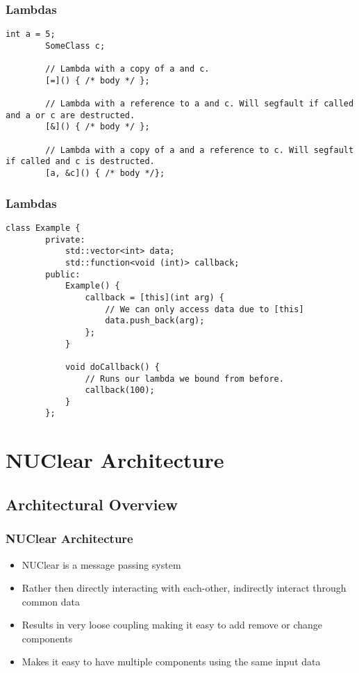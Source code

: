 \documentclass{beamer}
\begin{document}
\begin{frame}[fragile]
	\frametitle{Lambdas}
	\begin{lstlisting}[language=nuclear]
		int a = 5;
		SomeClass c;

		// Lambda with a copy of a and c.
		[=]() { /* body */ };

		// Lambda with a reference to a and c. Will segfault if called and a or c are destructed.
		[&]() { /* body */ };

		// Lambda with a copy of a and a reference to c. Will segfault if called and c is destructed.
		[a, &c]() { /* body */};
	\end{lstlisting}
\end{frame}

\begin{frame}[fragile]
	\frametitle{Lambdas}
	\begin{lstlisting}[language=nuclear]
		class Example {
		private:
		    std::vector<int> data;
		    std::function<void (int)> callback;
		public:
		    Example() {
		        callback = [this](int arg) {
		            // We can only access data due to [this]
		            data.push_back(arg);
		        };
		    }

		    void doCallback() {
		        // Runs our lambda we bound from before.
		        callback(100);
		    }
		};
	\end{lstlisting}
\end{frame}

\section{NUClear Architecture}
\subsection{Architectural Overview}
\begin{frame}
	\frametitle{NUClear Architecture}
	\begin{itemize}
		\item NUClear is a message passing system
		\item Rather then directly interacting with each-other, indirectly interact through common data
		\item Results in very loose coupling making it easy to add remove or change components
		\item Makes it easy to have multiple components using the same input data
	\end{itemize}
\end{frame}
\end{document}
